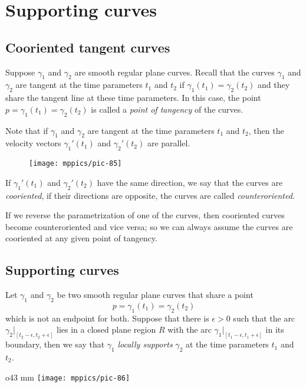 \chapter{Supporting curves}
\label{chap:supporting-curves}
\section{Cooriented tangent curves}

Suppose $\gamma_1$ and $\gamma_2$ are smooth regular plane curves.
Recall that the curves $\gamma_1$ and $\gamma_2$ are tangent at the  time parameters $t_1$ and $t_2$
if $\gamma_1(t_1)=\gamma_2(t_2)$
and they share the tangent line at these time parameters.
In this case, the point $p=\gamma_1(t_1)=\gamma_2(t_2)$ is called a \emph{point of tangency} of the curves.

Note that if $\gamma_1$ and $\gamma_2$ are tangent at the time parameters $t_1$ and $t_2$, 
then the velocity vectors $\gamma_1'(t_1)$ and $\gamma_2'(t_2)$ are parallel.
\begin{figure}[!ht]
\vskip-0mm
\centering
\texttt{[image: mppics/pic-85]}
\vskip0mm
\end{figure}
If $\gamma_1'(t_1)$ and $\gamma_2'(t_2)$ have the same direction, we say that the curves are \emph{cooriented},
if their directions are opposite, the curves are called \emph{counteroriented}.

If we reverse the parametrization of one of the curves, then cooriented curves become counteroriented and vice versa; so we can always assume the curves are cooriented at any given point of tangency.

\section{Supporting curves}

Let $\gamma_1$ and $\gamma_2$ be two smooth regular plane curves that share a point 
\[p=\gamma_1(t_1)=\gamma_2(t_2)\] 
which is not an endpoint for both.
Suppose that there is $\epsilon>0$ such that the arc $\gamma_2|_{[t_2-\epsilon, t_2+\epsilon]}$ lies in a closed plane region $R$ with the arc $\gamma_1|_{[t_1-\epsilon, t_1+\epsilon]}$ in its boundary,
then we say that $\gamma_1$ \emph{locally supports} $\gamma_2$ at the time parameters $t_1$ and $t_2$.

\begin{wrapfigure}[8]{o}{43 mm}
\vskip-3mm
\centering
\texttt{[image: mppics/pic-86]}
\vskip0mm
\end{wrapfigure}

